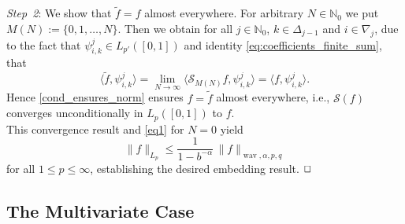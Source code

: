 \documentclass[12pt]{article}
\DeclareMathOperator{\wav}{wav}
\newenvironment{proof}{\begin{trivlist}
    \item[\hskip\labelsep{\it Proof.}]}{$\hfill\Box$\end{trivlist}}
\newcommand{\N}{\mathbb{N}}
\begin{document}
\begin{proof}
\emph{Step~2}: We show that $\tilde{f}=f$
almost everywhere. For arbitrary $N\in \N_0$ we put $M(N) := \{0,1,\ldots, N\}$. 
Then we obtain 
for all $j\in \N_0$, $k\in\Delta_{j-1}$ and $i\in\nabla_j$, due to the fact that $\psi^{j}_{i,k} \in L_{p'}([0,1])$ and identity \eqref{eq:coefficients_finite_sum}, that 
\begin{equation*}
 \langle \tilde{f}, \psi^{j}_{i,k} \rangle 
 = \lim_{N\to \infty}  \langle \mathcal{S}_{M(N)} f, \psi^{j}_{i,k} \rangle
 =  \langle f, \psi^{j}_{i,k} \rangle.
\end{equation*}
Hence \eqref{cond_ensures_norm} ensures
$f = \tilde{f}$ almost everywhere, i.e., $\mathcal{S}(f)$ converges unconditionally in $L_p([0,1])$ to $f$.
\\
This convergence result and  \eqref{eq1} for $N=0$ yield
\begin{equation*}
\| f \|_{L_p} 
\le \frac{1}{1 - b^{-\alpha}} \, \|f\|_{\wav,\alpha,p,q}
\end{equation*}
for all $1 \le p \le \infty$,
establishing the desired embedding result.
\end{proof}



\subsection{The Multivariate Case}
\label{HAAR-s}

\end{document}
